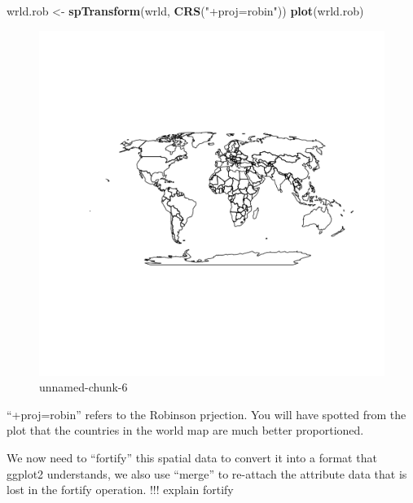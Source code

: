 \documentclass[]{article}
\makeatletter
\newenvironment{Shaded}{}{}
\newcommand{\KeywordTok}[1]{\textcolor[rgb]{0.00,0.44,0.13}{\textbf{{#1}}}}
\newcommand{\StringTok}[1]{\textcolor[rgb]{0.25,0.44,0.63}{{#1}}}
\newcommand{\NormalTok}[1]{{#1}}
\def\maxwidth{\ifdim\Gin@nat@width>\linewidth\linewidth
\else\Gin@nat@width\fi}
\let\Oldincludegraphics\includegraphics
\renewcommand{\includegraphics}[1]{\Oldincludegraphics[width=\maxwidth]{#1}}
\makeatother
\begin{document}
\begin{Shaded}
\begin{Highlighting}[]
\NormalTok{wrld.rob <- }\KeywordTok{spTransform}\NormalTok{(wrld, }\KeywordTok{CRS}\NormalTok{(}\StringTok{"+proj=robin"}\NormalTok{))}
\KeywordTok{plot}\NormalTok{(wrld.rob)}
\end{Highlighting}
\end{Shaded}
\begin{figure}[htbp]
\centering
\includegraphics{figure/unnamed-chunk-6.png}
\caption{unnamed-chunk-6}
\end{figure}

``+proj=robin'' refers to the Robinson prjection. You will have spotted
from the plot that the countries in the world map are much better
proportioned.

We now need to ``fortify'' this spatial data to convert it into a format
that ggplot2 understands, we also use ``merge'' to re-attach the
attribute data that is lost in the fortify operation. !!! explain
fortify
\end{document}
